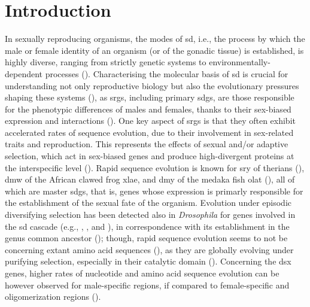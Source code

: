 \section{Introduction} \label{chapter:molecularEvolution-introduction}
In sexually reproducing organisms, the modes of \gls{sd}, i.e., the process by which the male or female identity of an organism (or of the gonadic tissue) is established, is highly diverse, ranging from strictly genetic systems to environmentally-dependent processes (). Characterising the molecular basis of \gls{sd} is crucial for understanding not only reproductive biology but also the evolutionary pressures shaping these systems (), as \glspl{srg}, including primary \glspl{sdg}, are those responsible for the phenotypic differences of males and females, thanks to their sex-biased expression and interactions (). One key aspect of \glspl{srg} is that they often exhibit accelerated rates of sequence evolution, due to their involvement in sex-related traits and reproduction. This represents the effects of sexual and/or adaptive selection, which act in sex-biased genes and produce high-divergent proteins at the interspecific level (). Rapid sequence evolution is known for \gls{sry} of therians (), \gls{dmw} of the African clawed frog \gls{xlae}, and \gls{dmy} of the medaka fish \gls{olat} (), all of which are master \glspl{sdg}, that is, genes whose expression is primarly responsible for the establishment of the sexual fate of the organism. Evolution under episodic diversifying selection has been detected also in \textit{Drosophila} for genes involved in the \gls{sd} cascade (e.g., , , and ), in correspondence with its establishment in the genus common ancestor (); though, rapid sequence evolution seems to not be concerning extant amino acid sequences (), as they are globally evolving under purifying selection, especially in their catalytic domain (). Concerning the \gls{dsx} genes, higher rates of nucleotide and amino acid sequence evolution can be however observed for male-specific regions, if compared to female-specific and oligomerization regions ().

